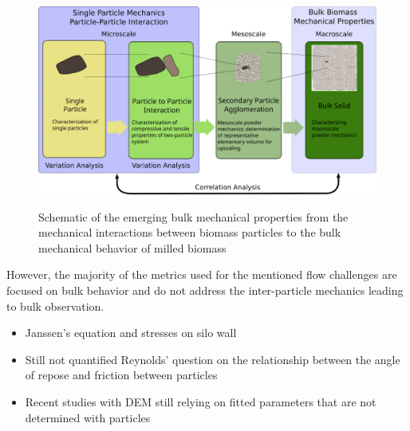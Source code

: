 \documentclass[xcolor=dvipsnames,10pt,hidelinks]{article}
\begin{document}
\begin{figure}[htbp]
\centering
\includegraphics[height=2.75in]{./figures/biomass_multiscale_schematic.png}
\caption{\label{fig:org36c3502}Schematic of the emerging bulk mechanical properties from the mechanical interactions between biomass particles to the bulk mechanical behavior of milled biomass}
\end{figure}

However, the majority of the metrics used for the mentioned flow challenges are focused on bulk behavior and do not address the inter-particle mechanics leading to bulk observation.

\begin{itemize}
\item Janssen's equation \citet{janssen1895versuche} and stresses on silo wall\citet{schulze_examination_1994}
\item Still not quantified Reynolds' question on the relationship between the angle of repose and friction between particles \citet{reynolds_lvii_1885}
\item Recent studies with DEM still relying on fitted parameters that are not determined with particles \citet{xia_defining_2023,chen_hopper_2023,chen_set_2022}
\end{itemize}
\end{document}
